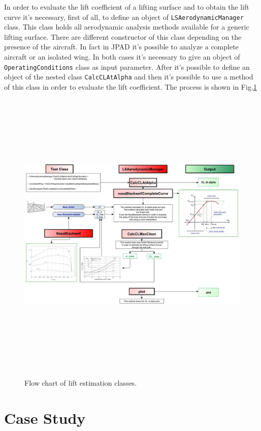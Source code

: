 In order to evaluate the lift coefficient of a lifting surface and to obtain the lift curve it's necessary, first of all, to define an object of \texttt{LSAerodynamicManager} class. This class holds all aerodynamic analysis methods available for a generic lifting surface. There are different constructor of this class depending on the presence of the aircraft. In fact in JPAD it's possible to analyze a complete aircraft or an isolated wing. In both cases it's necessary to give an object of \texttt{OperatingConditions} class as input parameter. After it's possible to define an object of the nested class \texttt{CalcCLAtAlpha} and then it's possible to use a method of this class in order to evaluate the lift coefficient. The process is shown in Fig.\ref{fig:clalf}

\begin{figure}[H]
\centering
{\includegraphics[height=14cm, angle=90]{Immagini/clflowchart.pdf}} 
\caption{Flow chart of lift estimation classes.}
\label{fig:clalf}
\end{figure}


\section{Case Study}

